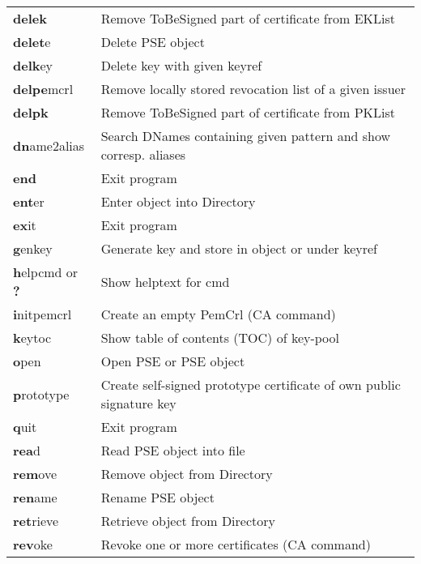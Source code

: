 \begin{tabular}{ll}
{\bf delek}        & Remove ToBeSigned part of certificate from EKList    	       \\
{\bf delet}e       & Delete PSE object                                                 \\
{\bf delk}ey       & Delete key with given keyref                                      \\
{\bf delpe}mcrl    & Remove locally stored revocation list of a given issuer           \\
{\bf delpk}        & Remove ToBeSigned part of certificate from PKList    	       \\
{\bf dn}ame2alias  & Search DNames containing given pattern and show corresp. aliases  \\
{\bf end}          & Exit program                                                      \\
{\bf ent}er	   & Enter object into Directory				       \\
{\bf ex}it         & Exit program                                                      \\
{\bf g}enkey       & Generate key and store in object or under keyref                  \\
{\bf h}elpcmd or {\bf ?} & Show helptext for cmd                                       \\
{\bf i}nitpemcrl   & Create an empty PemCrl (CA command)                               \\
{\bf k}eytoc       & Show table of contents (TOC) of key-pool                          \\
{\bf o}pen         & Open PSE or PSE object                                            \\
{\bf p}rototype    & Create self-signed prototype certificate of own public signature key \\
{\bf q}uit         & Exit program                                                      \\
{\bf rea}d         & Read PSE object into file                                         \\
{\bf rem}ove       & Remove object from Directory				       \\
{\bf ren}ame       & Rename PSE object                                                 \\
{\bf ret}rieve     & Retrieve object from Directory				       \\
{\bf rev}oke       & Revoke one or more certificates (CA command)                      \\

\end{tabular}
